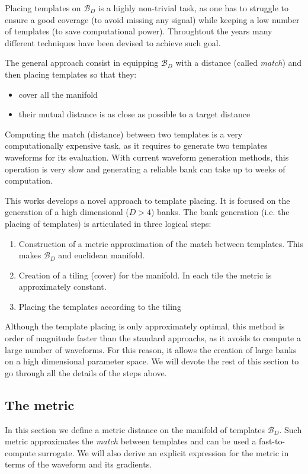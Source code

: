 \documentclass[twocolumn,showpacs,preprintnumbers,nofootinbib,prd,
superscriptaddress,10pt]{revtex4-1}
\begin{document}
Placing templates on $\mathcal{B}_D$ is a highly non-trivial task, as one has to struggle to ensure a good coverage (to avoid missing any signal) while keeping a low number of templates (to save computational power).
Throughtout the years many different techniques have been devised to achieve such goal.

The general approach consist in equipping $\mathcal{B}_D$ with a distance (called {\it match}) and then placing templates so that they:
\begin{itemize}
	\item cover all the manifold
	\item their mutual distance is as close as possible to a target distance
\end{itemize}
Computing the match (distance) between two templates is a very computationally expensive task, as it requires to generate two templates waveforms for its evaluation. With current waveform generation methods, this operation is very slow and generating a reliable bank can take up to weeks of computation.

This works develops a novel approach to template placing. It is focused on the generation of a high dimensional ($D>4$) banks.
The bank generation (i.e. the placing of templates) is articulated in three logical steps:

\begin{enumerate}
	\item Construction of a metric approximation of the match between templates. This makes $\mathcal{B}_D$ and euclidean manifold.
	\item Creation of a tiling (cover) for the manifold. In each tile the metric is approximately constant.
	\item Placing the templates according to the tiling
\end{enumerate}

Although the template placing is only approximately optimal, this method is order of magnitude faster than the standard approachs, as it avoids to compute a large number of waveforms. For this reason, it allows the creation of large banks on a high dimensional parameter space.
We will devote the rest of this section to go through all the details of the steps above.

\subsection{The metric} \label{sec:metric}

In this section we define a metric distance on the manifold of templates $\mathcal{B}_D$. Such metric approximates the {\it match} between templates and can be used a fast-to-compute surrogate. We will also derive an explicit expression for the metric in terms of the waveform and its gradients.
\end{document}
